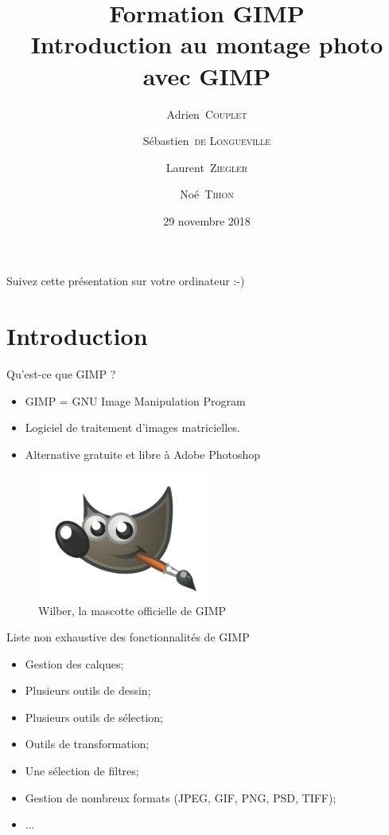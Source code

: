 \documentclass[10pt,svgnames,usenames,table]{beamer}
\institute{Louvain-li-Nux}
\title{\textbf{Formation GIMP}\\
Introduction au montage photo avec GIMP}
\author{Adrien~\textsc{Couplet} \and Sébastien~\textsc{de Longueville} \and Laurent~\textsc{Ziegler} \and Noé~\textsc{Tihon} }
\date{29 novembre 2018}
\begin{document}
\begin{frame}
	\maketitle
\end{frame}

\begin{frame}
  \begin{center}\Large
  Suivez cette présentation sur votre ordinateur :-)
  
  \vspace{1cm}
  \end{center}
\end{frame}

\section{Introduction}
\begin{frame}[allowframebreaks]{Qu'est-ce que GIMP ?}
    \begin{itemize}
        \item GIMP = GNU Image Manipulation Program
        \item Logiciel de traitement d'images matricielles.
        \item Alternative gratuite et libre à Adobe Photoshop
    \end{itemize}
    \begin{figure}
        \centering
        \includegraphics[width=0.5\textwidth]{Images/gimp-logo}
        \caption{Wilber, la mascotte officielle de GIMP} 
    \end{figure}
    \framebreak
    Liste non exhaustive des fonctionnalités de GIMP
    \begin{itemize}
        \item Gestion des calques;
        \item Plusieurs outils de dessin;
        \item Plusieurs outils de sélection;
        \item Outils de transformation;
        \item Une sélection de filtres;
        \item Gestion de nombreux formats (JPEG, GIF, PNG, PSD, TIFF);
        \item ...
    \end{itemize}
\end{frame}
\end{document}
